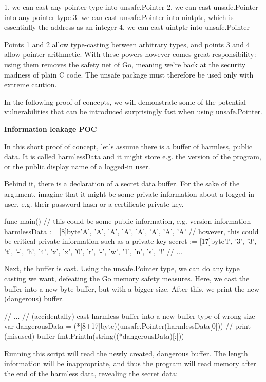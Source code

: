 1. we can cast any pointer type into unsafe.Pointer
2. we can cast unsafe.Pointer into any pointer type
3. we can cast unsafe.Pointer into uintptr, which is essentially the address as an integer
4. we can cast uintptr into unsafe.Pointer

Points 1 and 2 allow type-casting between arbitrary types, and points 3 and 4 allow pointer arithmetic. With these
powers however comes great responsibility: using them removes the safety net of Go, meaning we're back at the security
madness of plain C code. The unsafe package must therefore be used only with extreme caution.

In the following proof of concepts, we will demonstrate some of the potential vulnerabilities that can be introduced
surprisingly fast when using unsafe.Pointer.


\textbf{Information leakage POC}

In this short proof of concept, let's assume there is a buffer of harmless, public data. It is called harmlessData
and it might store e.g. the version of the program, or the public display name of a logged-in user.

Behind it, there is a declaration of a secret data buffer. For the sake of the argument, imagine that it might be some
private information about a logged-in user, e.g. their password hash or a certificate private key.

func main()
// this could be some public information, e.g. version information
harmlessData := [8]byte'A', 'A', 'A', 'A', 'A', 'A', 'A', 'A'
// however, this could be critical private information such as a private key
secret := [17]byte'l', '3', '3', 't', '-', 'h', '4', 'x', 'x', '0', 'r', '-', 'w', '1', 'n', 's', '!'
// ...


Next, the buffer is cast. Using the unsafe.Pointer type, we can do any type casting we want, defeating the Go memory
safety measures. Here, we cast the buffer into a new byte buffer, but with a bigger size. After this, we print the new
(dangerous) buffer.

// ...
// (accidentally) cast harmless buffer into a new buffer type of wrong size
var dangerousData = (*[8+17]byte)(unsafe.Pointer(harmlessData[0]))
// print (misused) buffer
fmt.Println(string((*dangerousData)[:]))


Running this script will read the newly created, dangerous buffer. The length information will be inappropriate, and
thus the program will read memory after the end of the harmless data, revealing the secret data:


